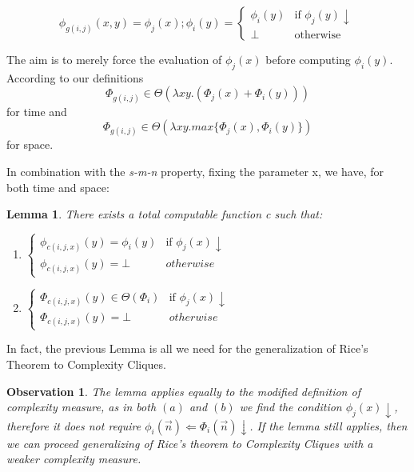 \documentclass[10pt, a4paper, oneside, titlepage, draft]{article}
\newtheorem{observation}{Observation}[shrd]
\newtheorem{lemma}[shrd]{Lemma}
\begin{document}
\begin{equation*}
    \phi_{g(i,j)}(x,y) = \phi_j(x);\phi_i(y) = 
    \begin{cases}
        \phi_i(y)   & \text{if } \phi_j(y)\downarrow    \\
        \bot        & \text{otherwise}
    \end{cases}
\end{equation*}

\noindent The aim is to merely force the evaluation of $\phi_j(x)$ before computing $\phi_i(y)$. According to our definitions
\begin{equation*}
    \Phi_{g(i,j)} \in \Theta ( \lambda xy . ( \Phi_j(x) + \Phi_i(y) ) )
\end{equation*}
for time and
\begin{equation*}
    \Phi_{g(i,j)} \in \Theta ( \lambda xy . max \{ \Phi_j(x) , \Phi_i(y) \} )
\end{equation*}
for space.

In combination with the \emph{s-m-n} property, fixing the parameter x, we have, for both time and space:

\begin{lemma}
    There exists a total computable function c such that:
    \begin{enumerate}[label=(\alph*)]
        \item $
            \begin{cases}
                \phi_{c(i,j,x)}(y) = \phi_i(y)  & \text{if  } \phi_j(x)\downarrow \\
                \phi_{c(i,j,x)}(y) = \bot       & otherwise
            \end{cases}
        $

        \item $
            \begin{cases}
                \Phi_{c(i,j,x)}(y) \in \Theta ( \Phi_i )  & \text{if  } \phi_j(x)\downarrow \\
                \Phi_{c(i,j,x)}(y) = \bot       & otherwise
            \end{cases}
        $
    \end{enumerate}
\end{lemma}

In fact, the previous Lemma is all we need for the generalization of Rice's Theorem to Complexity Cliques.

\begin{observation}
    The lemma applies equally to the modified definition of complexity measure, as in both $(a)$ and $(b)$ we find the condition $\phi_j(x)\downarrow$, therefore it does not require $\phi_i(\vec{n}) \Leftarrow \Phi_i(\vec{n})\downarrow$. If the lemma still applies, then we can proceed generalizing of Rice's theorem to Complexity Cliques with a weaker complexity measure.
\end{observation}
\end{document}
